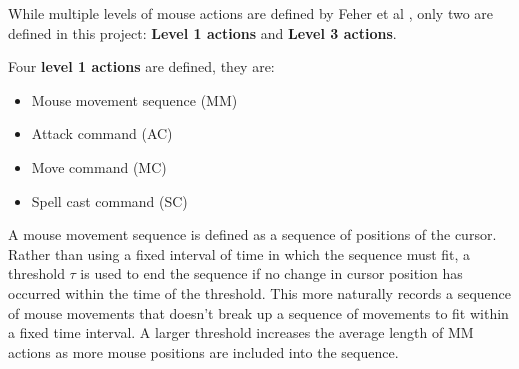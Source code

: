 \documentclass{../sty/SizheArticle}
\begin{document}
While multiple levels of mouse actions are defined by Feher et al \cite{mouse-dynamics}, only two are defined in this project: \textbf{Level 1 actions} and \textbf{Level 3 actions}.

Four \textbf{level 1 actions} are defined, they are:
\begin{itemize}
\item Mouse movement sequence (MM)
\item Attack command (AC)
\item Move command (MC)
\item Spell cast command (SC)
\end{itemize}
A mouse movement sequence is defined as a sequence of positions of the cursor. Rather than using a fixed interval of time in which the sequence must fit, a threshold $\tau$ is used to end the sequence if no change in cursor position has occurred within the time of the threshold. This more naturally records a sequence of mouse movements that doesn't break up a sequence of movements to fit within a fixed time interval. A larger threshold increases the average length of MM actions as more mouse positions are included into the sequence. 
\end{document}

